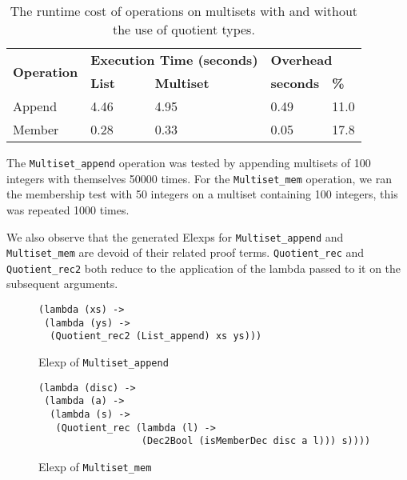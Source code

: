 \documentclass[12pt,twoside,maitrise]{dms}
\theoremstyle{definition}
\numberwithin{equation}{section}
\numberwithin{table}{chapter}
\numberwithin{figure}{chapter}
\newcommand\id[1] {\texttt{#1}}
\begin{document}
\begin{table}[H]
\centering
\begin{tabular}{@{}lllll@{}}
\toprule
\multirow{2}{*}{\textbf{Operation}} & \multicolumn{2}{l}{\textbf{Execution Time (seconds)}} & \multicolumn{2}{l}{\textbf{Overhead}} \\ \cmidrule(l){2-5}
       & \textbf{List} & \textbf{Multiset} & \textbf{seconds} & \textbf{\%} \\ \midrule
Append & 4.46          & 4.95              & 0.49             & 11.0        \\
Member & 0.28          & 0.33              & 0.05             & 17.8        \\ \bottomrule
\end{tabular}
\caption{The runtime cost of operations on multisets with and without the use of quotient types.}
\label{tab:benchmark-multiset}
\end{table}

The \id{Multiset\_append} operation was tested by appending multisets of 100
integers with themselves 50000 times. For the \id{Multiset\_mem} operation, we
ran the membership test with 50 integers on a multiset containing 100 integers,
this was repeated 1000 times.


We also observe that the generated Elexps for \id{Multiset\_append} and
\id{Multiset\_mem} are devoid of their related proof terms. \id{Quotient\_rec}
and \id{Quotient\_rec2} both reduce to the application of the lambda passed to
it on the subsequent arguments.

\begin{figure}[H]
\begin{verbatim}
(lambda (xs) ->
 (lambda (ys) ->
  (Quotient_rec2 (List_append) xs ys)))
\end{verbatim}
\caption{Elexp of \id{Multiset\_append}}
\end{figure}

\begin{figure}[H]
\begin{verbatim}
(lambda (disc) ->
 (lambda (a) ->
  (lambda (s) ->
   (Quotient_rec (lambda (l) ->
                  (Dec2Bool (isMemberDec disc a l))) s))))
\end{verbatim}
\caption{Elexp of \id{Multiset\_mem}}
\end{figure}
\end{document}
